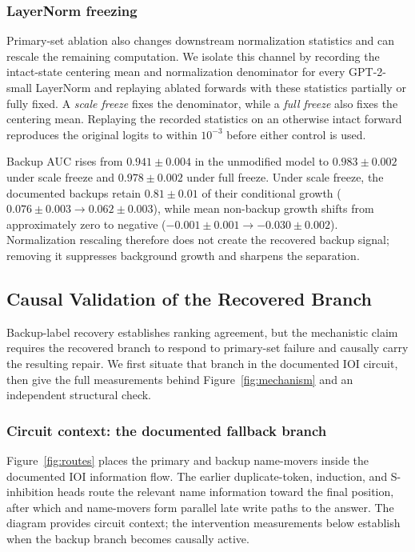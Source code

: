 \subsubsection{LayerNorm freezing}
\label{app:lnfreeze}

Primary-set ablation also changes downstream normalization statistics and can rescale the remaining computation.
We isolate this channel by recording the intact-state centering mean and normalization denominator for every GPT-2-small LayerNorm and replaying ablated forwards with these statistics partially or fully fixed.
A \emph{scale freeze} fixes the denominator, while a \emph{full freeze} also fixes the centering mean.
Replaying the recorded statistics on an otherwise intact forward reproduces the original logits to within $10^{-3}$ before either control is used.

Backup AUC rises from $0.941{\pm}0.004$ in the unmodified model to $0.983{\pm}0.002$ under scale freeze and $0.978{\pm}0.002$ under full freeze.
Under scale freeze, the documented backups retain $0.81{\pm}0.01$ of their conditional growth ($0.076{\pm}0.003\to0.062{\pm}0.003$), while mean non-backup growth shifts from approximately zero to negative ($-0.001{\pm}0.001\to-0.030{\pm}0.002$).
Normalization rescaling therefore does not create the recovered backup signal; removing it suppresses background growth and sharpens the separation.


\subsection{Causal Validation of the Recovered Branch}
\label{app:real-group}

Backup-label recovery establishes ranking agreement, but the mechanistic claim requires the recovered branch to respond to primary-set failure and causally carry the resulting repair.
We first situate that branch in the documented IOI circuit, then give the full measurements behind Figure~\ref{fig:mechanism} and an independent structural check.


\subsubsection{Circuit context: the documented fallback branch}
\label{app:circuitviz}

Figure~\ref{fig:routes} places the primary and backup name-movers inside the documented IOI information flow.
The earlier duplicate-token, induction, and S-inhibition heads route the relevant name information toward the final position, after which  and  name-movers form parallel late write paths to the answer.
The diagram provides circuit context; the intervention measurements below establish when the backup branch becomes causally active.

